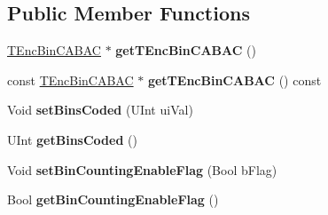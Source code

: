 \subsection*{Public Member Functions}
\begin{DoxyCompactItemize}
\item 
\mbox{\label{class_t_enc_bin_c_a_b_a_c_a84c7db9cbf7dbb8ec7f8766389c4821f}} 
\hyperlink{class_t_enc_bin_c_a_b_a_c}{T\+Enc\+Bin\+C\+A\+B\+AC} $\ast$ {\bfseries get\+T\+Enc\+Bin\+C\+A\+B\+AC} ()
\item 
\mbox{\label{class_t_enc_bin_c_a_b_a_c_a13492b6569d891360ec31cc43d3d3a3b}} 
const \hyperlink{class_t_enc_bin_c_a_b_a_c}{T\+Enc\+Bin\+C\+A\+B\+AC} $\ast$ {\bfseries get\+T\+Enc\+Bin\+C\+A\+B\+AC} () const
\item 
\mbox{\label{class_t_enc_bin_c_a_b_a_c_a5da2184658c66ad6e4788acd9d66b594}} 
Void {\bfseries set\+Bins\+Coded} (U\+Int ui\+Val)
\item 
\mbox{\label{class_t_enc_bin_c_a_b_a_c_a3d4c5b722fd0e9c67ddfc5e10967326b}} 
U\+Int {\bfseries get\+Bins\+Coded} ()
\item 
\mbox{\label{class_t_enc_bin_c_a_b_a_c_a5ad9ede66b042bf7ac88739640300b9c}} 
Void {\bfseries set\+Bin\+Counting\+Enable\+Flag} (Bool b\+Flag)
\item 
\mbox{\label{class_t_enc_bin_c_a_b_a_c_a0618d5c0e87bcc28c863368502d4f0e0}} 
Bool {\bfseries get\+Bin\+Counting\+Enable\+Flag} ()
\end{DoxyCompactItemize}
